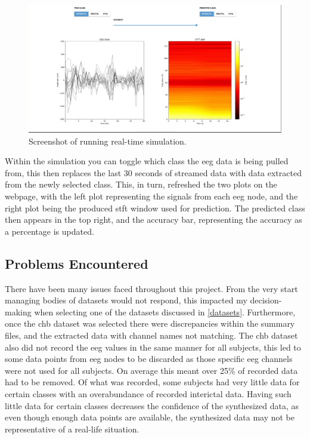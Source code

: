 \documentclass[12pt]{article}
\begin{document}
\begin{figure}[H]
\includegraphics[width=\textwidth]{real-time}
\centering
\caption{Screenshot of running real-time simulation.}
\label{fig:real-time}
\end{figure}

Within the simulation you can toggle which class the \acrshort{eeg} data is being pulled from, this then replaces the last 30 seconds of streamed data with data extracted from the newly selected class. This, in turn, refreshed the two plots on the webpage, with the left plot representing the signals from each \acrshort{eeg} node, and the right plot being the produced \acrshort{stft} window used for prediction. The predicted class then appears in the top right, and the accuracy bar, representing the accuracy as a percentage is updated.


\subsection{Problems Encountered}\label{issues}


There have been many issues faced throughout this project. From the very start managing bodies of datasets would not respond, this impacted my decision-making when selecting one of the datasets discussed in \ref{datasets}. Furthermore, once the \acrshort{chb} dataset was selected there were discrepancies within the summary files, and the extracted data with channel names not matching. The \acrshort{chb} dataset also did not record the \acrshort{eeg} values in the same manner for all subjects, this led to some data points from \acrshort{eeg} nodes to be discarded as those specific \acrshort{eeg} channels were not used for all subjects. On average this meant over 25\% of recorded data had to be removed. Of what was recorded, some subjects had very little data for certain classes with an overabundance of recorded interictal data. Having such little data for certain classes decreases the confidence of the synthesized data, as even though enough data points are available, the synthesized data may not be representative of a real-life situation.
\end{document}
